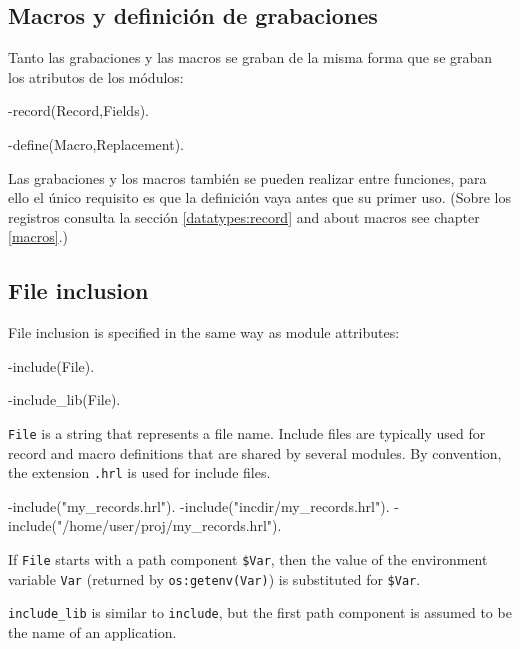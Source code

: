 \subsection{Macros y definici\'on de grabaciones}

Tanto las grabaciones y las macros se graban de la misma forma que se graban los atributos de los m\'odulos: 

\begin{erlang}
-record(Record,Fields).

-define(Macro,Replacement).
\end{erlang}
Las grabaciones y los macros tambi\'en se pueden realizar entre funciones, para ello el \'unico requisito es que la definici\'on vaya antes que su primer uso. (Sobre los registros consulta la secci\'on \ref{datatypes:record} and about macros see chapter \ref{macros}.)

\subsection{File inclusion}

File inclusion is specified in the same way as module attributes:

\begin{erlang}
-include(File).

-include_lib(File).
\end{erlang}

\texttt{File} is a string that represents a file name. Include files
are typically used for record and macro definitions that are shared by
several modules. By convention, the extension \texttt{.hrl} is used
for include files.

\begin{erlang}
-include("my_records.hrl").
-include("incdir/my_records.hrl").
-include("/home/user/proj/my_records.hrl").
\end{erlang}

If \texttt{File} starts with a path component \texttt{\$Var}, then the value of
the environment variable \texttt{Var} (returned by
\texttt{os:getenv(Var)}) is substituted for \texttt{\$Var}.


\texttt{include\_lib} is similar to \texttt{include}, but the
first path component is assumed to be the name of an application.

